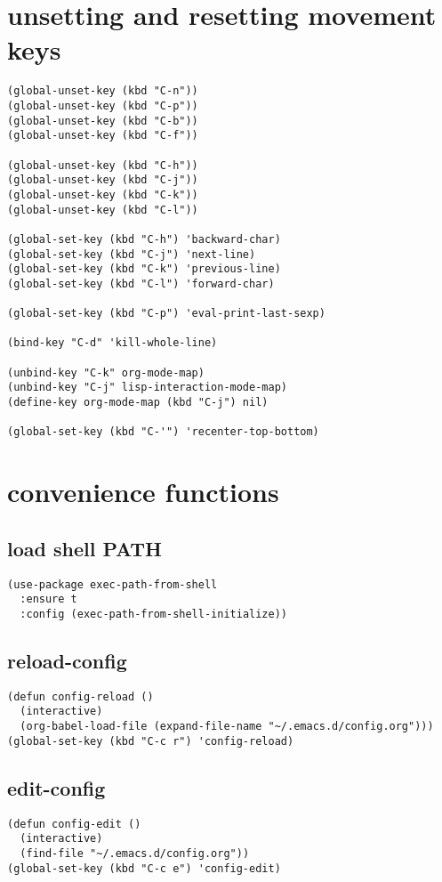 \documentclass[11pt]{article}
\begin{document}
\section{unsetting and resetting movement keys}
\label{sec:org0d25e93}
\begin{verbatim}
(global-unset-key (kbd "C-n"))
(global-unset-key (kbd "C-p"))
(global-unset-key (kbd "C-b"))
(global-unset-key (kbd "C-f"))

(global-unset-key (kbd "C-h"))
(global-unset-key (kbd "C-j"))
(global-unset-key (kbd "C-k"))
(global-unset-key (kbd "C-l"))

(global-set-key (kbd "C-h") 'backward-char)
(global-set-key (kbd "C-j") 'next-line)
(global-set-key (kbd "C-k") 'previous-line)
(global-set-key (kbd "C-l") 'forward-char)

(global-set-key (kbd "C-p") 'eval-print-last-sexp)

(bind-key "C-d" 'kill-whole-line)

(unbind-key "C-k" org-mode-map)
(unbind-key "C-j" lisp-interaction-mode-map)
(define-key org-mode-map (kbd "C-j") nil)

(global-set-key (kbd "C-'") 'recenter-top-bottom)
\end{verbatim}
\section{convenience functions}
\label{sec:org498070b}
\subsection{load shell PATH}
\label{sec:org011ea71}
\begin{verbatim}
(use-package exec-path-from-shell
  :ensure t
  :config (exec-path-from-shell-initialize))
\end{verbatim}
\subsection{reload-config}
\label{sec:org9c411c0}
\begin{verbatim}
(defun config-reload ()
  (interactive)
  (org-babel-load-file (expand-file-name "~/.emacs.d/config.org")))
(global-set-key (kbd "C-c r") 'config-reload)
\end{verbatim}
\subsection{edit-config}
\label{sec:org3a3028c}
\begin{verbatim}
(defun config-edit ()
  (interactive)
  (find-file "~/.emacs.d/config.org"))
(global-set-key (kbd "C-c e") 'config-edit)
\end{verbatim}
\end{document}
